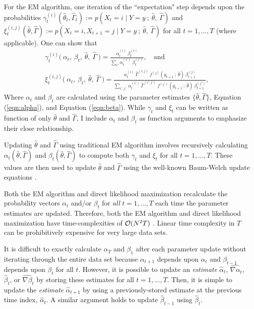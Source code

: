 For the EM algorithm, one iteration of the ``expectation" step depends upon the probabilities $\gamma_{t}^{(i)}(\hat \theta_t, \hat \Gamma_t) := p(X_t = i \mid Y = y ~ ; ~ \hat \theta, ~ \hat \Gamma)$ and $\xi_{t}^{(i,j)}(\hat \theta, \hat \Gamma) := p(X_t = i, X_{t+1} = j \mid Y = y ~ ; ~ \hat \theta, ~ \hat \Gamma)$ for all $t = 1,\ldots,T$ (where applicable). One can show that
%
\begin{gather}
    \gamma_{t}^{(i)}\big(~\alpha_t, ~\beta_t, ~\hat \theta, ~ \hat \Gamma ~ \big) = \frac{\alpha_{t}^{(i)} ~ \beta_{t}^{(i)}}{\sum_{i'} \alpha_{t}^{(i')} ~ \beta_{t}^{(i')}}, \quad \text{and} \label{eqn:gamma} \\
    \xi_{t}^{(i,j)}\big(~\alpha_t, ~\beta_t, ~\hat \theta, ~ \hat \Gamma ~ \big) = \frac{\alpha_{t}^{(i)} ~ \hat \Gamma^{(i,j)} ~ f^{(j)}(y_{t+1} ~ ; ~ \hat \theta) ~ \beta_{t+1}^{(j)}}{\sum_{i',j'} ~ \alpha_{t}^{(i')} ~ \hat \Gamma^{(i',j')} ~ f^{(j')}(y_{t+1} ~ ; ~\hat \theta) ~ \beta_{t+1}^{(j')}} \label{eqn:xi},
\end{gather}
%
Where $\alpha_t$ and $\beta_t$ are calculated using the parameter estimates $\{\hat \theta, \hat \Gamma\}$, Equation (\ref{eqn:alpha}), and Equation (\ref{eqn:beta}). While $\gamma_t$ and $\xi_{t}$ can be written as function of only $\hat \theta$ and $\hat \Gamma$, I include $\alpha_t$ and $\beta_t$ as function arguments to emphasize their close relationship.

Updating $\hat \theta$ and $\hat \Gamma$ using traditional EM algorithm involves recursively calculating $\alpha_t(\hat \theta, \hat \Gamma)$ and $\beta_t(\hat \theta, \hat \Gamma)$ to compute both $\gamma_{t}$ and $\xi_{t}$ for all $t = 1,\ldots,T$. These values are then used to update $\hat \theta$ and $\hat \Gamma$ using the well-known Baum-Welch update equations \citep{Baum:1970}.

Both the EM algorithm and direct likelihood maximization recalculate the probability vectors $\alpha_t$ and/or $\beta_t$ for \textit{all} $t = 1,\ldots,T$ each time the parameter estimates are updated. Therefore, both the EM algorithm and direct likelihood maximization have time-complexities of $\mathcal{O}(N^2T)$ \citep{Khreich:2012}. Linear time complexity in $T$ can be prohibitively expensive for very large data sets.

It is difficult to exactly calculate $\alpha_{T}$ and $\beta_1$ after each parameter update without iterating through the entire data set because $\alpha_{t+1}$ depends upon $\alpha_{t}$ and $\beta_{t-1}$ depends upon $\beta_{t}$ for all $t$. However, it is possible to update an \textit{estimate} $\hat \alpha_{t}$, $\widehat{\nabla \alpha}_{t}$, $\hat \beta_{t}$, or $\widehat{\nabla \beta}_{t}$ by storing these estimates for all $t = 1,\ldots,T$. Then, it is simple to update the \textit{estimate} $\hat \alpha_{t+1}$ by using a previously-stored estimate at the previous time index, $\hat \alpha_{t}$. A similar argument holds to update $\hat \beta_{t-1}$ using $\hat \beta_t$.


